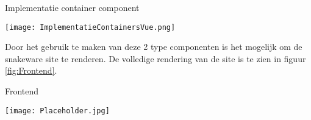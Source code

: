 \whitespace
\begin{graphic}
    \captionsetup{type=figure}
    \caption{Implementatie container component}
    \texttt{[image: ImplementatieContainersVue.png]}
    \label{fig:FrontendContainerImplementatie}
\end{graphic}

\whitespace
Door het gebruik te maken van deze 2 type componenten is het mogelijk om de snakeware site te renderen.
De volledige rendering van de site is te zien in figuur \ref{fig:Frontend}.

\whitespace
\begin{graphic}
    \captionsetup{type=figure}
    \caption{Frontend}
    \texttt{[image: Placeholder.jpg]}
    \label{fig:Frontend}
\end{graphic}

